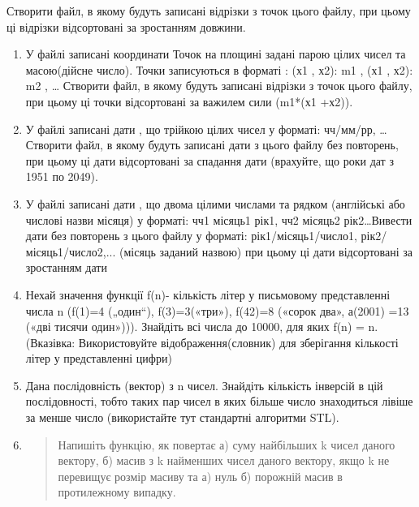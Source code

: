 \documentclass[]{article}
\begin{document}
Створити файл, в якому будуть записані відрізки з точок цього файлу, при
цьому ці відрізки відсортовані за зростанням довжини.

\begin{enumerate}
\def\labelenumi{\arabic{enumi})}
\item
  У файлі записані координати Точок на площині задані парою цілих чисел
  та масою(дійсне число). Точки записуються в форматі : (х1 , х2): m1 ,
  (х1 , х2): m2 , \ldots{} Створити файл, в якому будуть записані
  відрізки з точок цього файлу, при цьому ці точки відсортовані за
  важилем сили (m1*(х1 +х2)).
\item
  У файлі записані дати , що трійкою цілих чисел у форматі: чч/мм/рр,
  \ldots{} Створити файл, в якому будуть записані дати з цього файлу без
  повторень, при цьому ці дати відсортовані за спадання дати (врахуйте,
  що роки дат з 1951 по 2049).
\item
  У файлі записані дати , що двома цілими числами та рядком (англійські
  або числові назви місяця) у форматі: чч1 місяць1 рік1, чч2 місяць2
  рік2\ldots{}Вивести дати без повторень з цього файлу у форматі:
  рік1/місяць1/число1, рік2/місяць1/число2,... (місяць заданий назвою)
  при цьому ці дати відсортовані за зростанням дати
\item
  Нехай значення функції f(n)- кількість літер у письмовому
  представленні числа n (f(1)=4 („один``), f(3)=3(«три»), f(42)=8
  («сорок два», а(2001) =13 («дві тисячи один»))). Знайдіть всі числа до
  10000, для яких f(n) = n. (Вказівка: Використовуйте
  відображення(словник) для зберігання кількості літер у представленні
  цифри)
\item
  Дана послідовність (вектор) з n чисел. Знайдіть кількість інверсій в
  цій послідовності, тобто таких пар чисел в яких більше число
  знаходиться лівіше за менше число (використайте тут стандартні
  алгоритми STL).
\item
  \begin{quote}
  Напишіть функцію, як повертає а) суму найбільших k чисел даного
  вектору, б) масив з k найменших чисел даного вектору, якщо k не
  перевищує розмір масиву та а) нуль б) порожній масив в протилежному
  випадку.
  \end{quote}
\end{enumerate}
\end{document}
